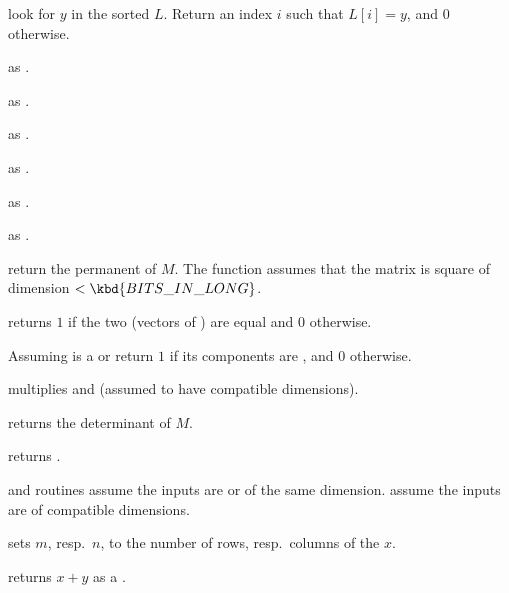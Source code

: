 look for $y$ in the sorted
 $L$. Return an index $i$ such that $L[i] = y$, and  $0$ otherwise.

 as .

 as .

 as .

 as .

 as .

 as .

 return the permanent of $M$.
The function assumes that the matrix is square of dimension
$< \kbd{BITS\_IN\_LONG}$.

 returns $1$ if the two  (vectors
of ) are equal and $0$ otherwise.


 Assuming  is a 
or  return $1$ if its components are , and $0$ otherwise.





 multiplies  and  (assumed to
have compatible dimensions).

 returns the determinant of $M$.

 returns .


 and  routines assume the inputs are  or 
of the same dimension.  assume the inputs are  of
compatible dimensions.


 sets $m$, resp.~$n$, to
the number of rows, resp.~columns of the  $x$.

 returns $x + y$ as a .

